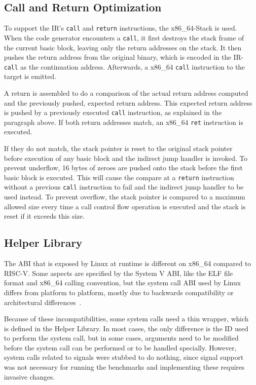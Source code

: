 \documentclass[course=eragp]{aspdoc}
\begin{document}
\subsection{Call and Return Optimization}
To support the IR's \texttt{call} and \texttt{return} instructions, the x86\_64-Stack is used. When
the code generator encounters a \texttt{call}, it first destroys the stack frame of the current
basic block, leaving only the return addresses on the stack. It then pushes the return address
from the original binary, which is encoded in the IR-\texttt{call} as the continuation address. Afterwards,
a x86\_64 \texttt{call} instruction to the target is emitted.

\par

A return is assembled to do a comparison of the actual return address computed and the previously
pushed, expected return address. This expected return address is pushed by a previously executed
\texttt{call} instruction, as explained in the paragraph above. If both return addresses match, an
x86\_64 \texttt{ret} instruction is executed.

\par

If they do not match, the stack pointer is reset
to the original stack pointer before execution of any basic block and the indirect jump handler is invoked.
To prevent underflow, 16 bytes of zeroes are pushed onto the stack before the first basic block is
executed. This will cause the compare at a \texttt{return} instruction without a previous
\texttt{call} instruction to fail and the indirect jump handler to be used instead.
To prevent overflow, the stack pointer is compared to a maximum allowed size every time a call
control flow operation is executed and the stack is reset if it exceeds this size.

\subsection{Helper Library}\label{helper}

The ABI that is exposed by Linux at runtime is different on x86\_64 compared to RISC-V. Some aspects are specified by
the System V ABI, like the ELF file format and x86\_64 calling convention, but the system call ABI used by Linux differs
from platform to platform, mostly due to backwards compatibility or architectural differences~\cite{man_syscalls}.

Because of these incompatibilities, some system calls need a thin wrapper, which is defined in the Helper Library. In
most cases, the only difference is the ID used to perform the system call, but in some cases, arguments need to be
modified before the system call can be performed or to be handled specially.
However, system calls related to signals were stubbed to do nothing, since signal support was not necessary for running
the benchmarks and implementing these requires invasive changes.
\end{document}

